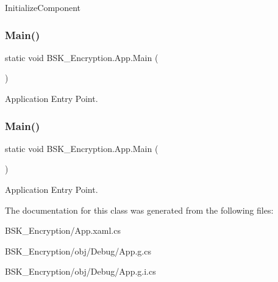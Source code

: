 Initialize\+Component 

\mbox{\label{class_b_s_k___encryption_1_1_app_a93bd4c8173c18bc4f08e342fce264162}} 
\subsubsection{\texorpdfstring{Main()}{Main()}\hspace{0.1cm}{\footnotesize\ttfamily [1/2]}}
{\footnotesize\ttfamily static void B\+S\+K\+\_\+\+Encryption.\+App.\+Main (\begin{DoxyParamCaption}{ }\end{DoxyParamCaption})\hspace{0.3cm}{\ttfamily [static]}}



Application Entry Point. 

\mbox{\label{class_b_s_k___encryption_1_1_app_a93bd4c8173c18bc4f08e342fce264162}} 
\subsubsection{\texorpdfstring{Main()}{Main()}\hspace{0.1cm}{\footnotesize\ttfamily [2/2]}}
{\footnotesize\ttfamily static void B\+S\+K\+\_\+\+Encryption.\+App.\+Main (\begin{DoxyParamCaption}{ }\end{DoxyParamCaption})\hspace{0.3cm}{\ttfamily [static]}}



Application Entry Point. 



The documentation for this class was generated from the following files\+:\begin{DoxyCompactItemize}
\item 
B\+S\+K\+\_\+\+Encryption/App.\+xaml.\+cs\item 
B\+S\+K\+\_\+\+Encryption/obj/\+Debug/App.\+g.\+cs\item 
B\+S\+K\+\_\+\+Encryption/obj/\+Debug/App.\+g.\+i.\+cs\end{DoxyCompactItemize}
